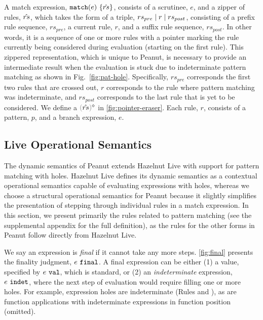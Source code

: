 A match expression, $\mathtt{match}(e)~\{\hat{rs}\}$, 
consists of a scrutinee, $e$, and a zipper of rules, $\hat{rs}$, which takes the form of a triple, $rs_{pre} \mid r \mid rs_{post}$, consisting of a prefix rule sequence, $rs_{pre}$, a current rule, $r$, and a suffix rule sequence, $rs_{post}$. In other words, it is a sequence of one or more rules with a pointer marking the rule currently being considered during evaluation (starting on the first rule). This zippered representation, which is unique to Peanut, is necessary to provide an intermediate result when the evaluation is stuck due to indeterminate pattern matching as shown in Fig.~\ref{fig:pat-hole}. Specifically, $rs_{pre}$ corresponds the first two rules that are crossed out, $r$ corresponds to the rule where pattern matching was indeterminate, and $rs_{post}$ corresponds to the last rule that is yet to be considered. We define a  $\rmpointer{\zrules}$ in \autoref{fig:pointer-eraser}. 
Each rule, $r$, consists of a pattern, $p$, and a branch expression, $e$.

\subsection{Live Operational Semantics}\label{sec:dynamics}


The dynamic semantics of Peanut extends Hazelnut Live \cite{DBLP:journals/pacmpl/OmarVCH19} with support for pattern matching with holes. Hazelnut Live defines its dynamic semantics as a contextual operational  semantics \cite{DBLP:conf/ppdp/PientkaD08} capable of evaluating expressions with holes, whereas we choose a structural operational semantics \cite{DBLP:journals/jlp/Plotkin04a} for Peanut because it slightly simplifies the presentation of stepping through individual rules in a match expression. In this section, we present primarily the rules related to pattern matching (see the supplemental appendix for the full definition), as the rules for the other forms in Peanut follow directly from Hazelnut Live. 




We say an expression is \textit{final} if it cannot take any more steps. \autoref{fig:final} presents the finality judgment, $e ~\mathtt{final}$. A final expression can be either (1) a value, specified by $e ~\mathtt{val}$, which is standard, or (2) an  \emph{indeterminate} expression, $e ~\mathtt{indet}$, where the next step of evaluation would require filling one or more holes. For example, expression holes are indeterminate (Rules \IEHole and \IHole), as are function applications with indeterminate expressions in function position (omitted). 



